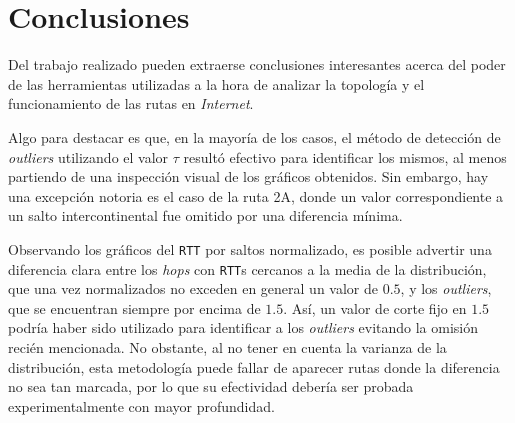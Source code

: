 \section{Conclusiones}

Del trabajo realizado pueden extraerse conclusiones interesantes acerca del
poder de las herramientas utilizadas a la hora de analizar la topología y el
funcionamiento de las rutas en \emph{Internet}.

Algo para destacar es que, en la mayoría de los casos, el método de detección
de \emph{outliers} utilizando el valor $\tau$ resultó efectivo para
identificar los mismos, al menos partiendo de una inspección visual de los
gráficos obtenidos. Sin embargo, hay una excepción notoria es el caso de la
ruta 2A, donde un valor correspondiente a un salto intercontinental fue
omitido por una diferencia mínima.

Observando los gráficos del \texttt{RTT} por saltos normalizado, es posible
advertir una diferencia clara entre los \emph{hops} con \texttt{RTT}s cercanos
a la media de la distribución, que una vez normalizados no exceden en general
un valor de $0.5$, y los \emph{outliers}, que se encuentran siempre por encima
de $1.5$. Así, un valor de corte fijo en $1.5$ podría haber sido utilizado
para identificar a los \emph{outliers} evitando la omisión recién mencionada.
No obstante, al no tener en cuenta la varianza de la distribución, esta
metodología puede fallar de aparecer rutas donde la diferencia no sea tan
marcada, por lo que su efectividad debería ser probada experimentalmente con
mayor profundidad.

